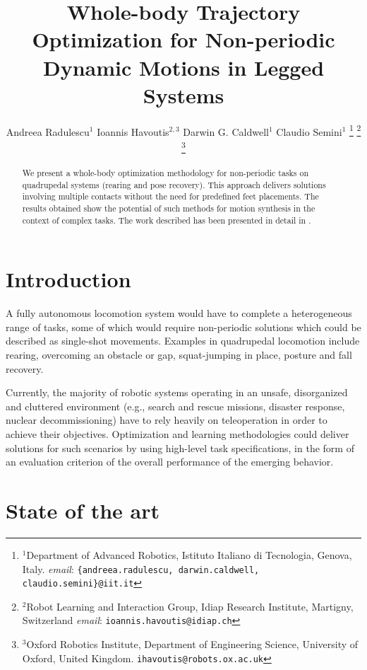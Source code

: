 \documentclass[usletter, 10pt, conference]{ieeeconf}      %
\title{\LARGE \bf Whole-body Trajectory Optimization for Non-periodic Dynamic Motions in Legged Systems}
\author{Andreea Radulescu$^{1}$  Ioannis Havoutis$^{2,3}$ Darwin G. Caldwell$^1$ Claudio Semini$^{1}$ 
\thanks{$^{1}$Department of Advanced Robotics, Istituto Italiano di
Tecnologia, Genova, Italy. \textit{email}: {\tt\small \{andreea.radulescu, darwin.caldwell,  claudio.semini\}@iit.it}}%
\thanks{$^{2}$Robot Learning and Interaction Group, Idiap Research Institute, 
Martigny, Switzerland \textit{email}: {\tt\small ioannis.havoutis@idiap.ch}}%
\thanks{$^{3}$Oxford Robotics Institute, Department of Engineering Science, University of Oxford, United Kingdom. {\tt\small ihavoutis@robots.ox.ac.uk}}%
}
\begin{document}
\maketitle
\thispagestyle{empty}
\pagestyle{empty}

\begin{abstract}
We present a whole-body optimization methodology for non-periodic tasks on quadrupedal systems (rearing and pose recovery). 
This approach delivers solutions involving multiple contacts without 
the need for predefined feet placements. The results obtained show the potential of such methods for 
motion synthesis in the context of complex tasks. The work described has been presented in
detail in \cite{icra17radulescu}.
\end{abstract}


\section{Introduction}

A fully autonomous locomotion system would have to complete a heterogeneous range of tasks, some
of which would require non-periodic solutions which could be described as single-shot movements.
Examples in quadrupedal locomotion include rearing, overcoming an obstacle or gap, 
squat-jumping in place, posture and fall recovery. 

Currently, the majority of robotic systems operating in an unsafe, disorganized and cluttered 
environment (e.g., search and rescue missions, disaster response, nuclear decommissioning) have to rely 
heavily on teleoperation in order to achieve their objectives. 
Optimization and learning methodologies could deliver solutions for such scenarios 
by using high-level task specifications, in the form of an evaluation criterion 
of the overall performance of the emerging behavior. 

\section{State of the art}
\end{document}
